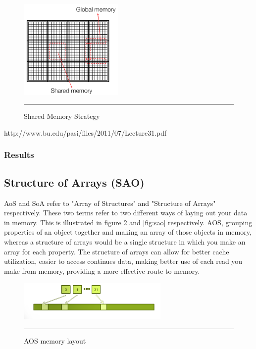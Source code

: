 \begin{figure}[htbp]
	\centering
		\includegraphics[width=0.45\textwidth]{Figures/shared.png}
		\rule{35em}{0.2pt}
	\caption[Shared Memory Strategy]{Shared Memory Strategy }
	\label{fig:shared}
\end{figure}

http://www.bu.edu/pasi/files/2011/07/Lecture31.pdf


\subsubsection{Results}


\subsection{Structure of Arrays (SAO)}



AoS and SoA refer to "Array of Structures" and "Structure of Arrays" respectively. These two terms refer to two different ways of laying out your data in memory. This is illustrated in figure \ref{fig:aos} and \ref{fig:sao} respectively. AOS, grouping properties of an object together and making an array of those objects in memory, whereas a structure of arrays would be a single structure in which you make an array for each property. The structure of arrays can allow for better cache utilization, easier to access continues data, making better use of each read you make from memory, providing a more effective route to memory. 

\begin{figure}[htbp]
	\centering
		\includegraphics[width=0.65\textwidth]{Figures/aos.png}
		\rule{35em}{0.2pt}
	\caption[Array of structures (AOS)]{AOS memory layout }
	\label{fig:aos}
\end{figure}


